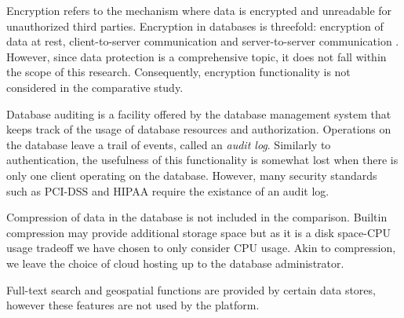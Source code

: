 Encryption refers to the mechanism where data is encrypted and unreadable for unauthorized third parties.
Encryption in databases is threefold: encryption of data at rest, client-to-server communication and server-to-server communication \autocite{Grolinger2013}.
However, since data protection is a comprehensive topic, it does not fall within the scope of this research.
Consequently, encryption functionality is not considered in the comparative study.

Database auditing is a facility offered by the database management system that keeps track of the usage of database resources and authorization.
Operations on the database leave a trail of events, called an \textit{audit log}.
Similarly to authentication, the usefulness of this functionality is somewhat lost when there is only one client operating on the database.
However, many security standards such as PCI-DSS and HIPAA require the existance of an audit log.

Compression of data in the database is not included in the comparison.
Builtin compression may provide additional storage space but as it is a disk space-CPU usage tradeoff we have chosen to only consider CPU usage.
Akin to compression, we leave the choice of cloud hosting up to the database administrator.

Full-text search and geospatial functions are provided by certain data stores, however these features are not used by the platform.
